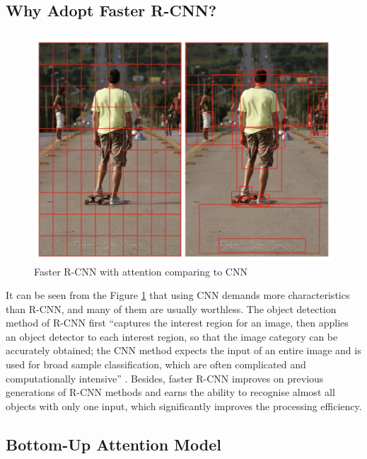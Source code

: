 
\subsection{Why Adopt Faster R-CNN?}

\begin{figure}[h!]
\centering
\includegraphics[width=.5\textwidth]{whyfasterrcnn.pdf}
\caption{Faster R-CNN with attention comparing to CNN \cite{bottomup}}
\label{fig:fasterrcnnbottomup}
\end{figure}

It can be seen from the Figure \ref{fig:fasterrcnnbottomup} that using CNN demands more characteristics than R-CNN, and many of them are usually worthless. The object detection method of R-CNN first ``captures the interest region for an image, then applies an object detector to each interest region, so that the image category can be accurately obtained; the CNN method expects the input of an entire image and is used for broad sample classification, which are often complicated and computationally intensive'' \cite{bottomup}. Besides, faster R-CNN improves on previous generations of R-CNN methods and earns the ability to recognise almost all objects with only one input, which significantly improves the processing efficiency.

\subsection{Bottom-Up Attention Model}

